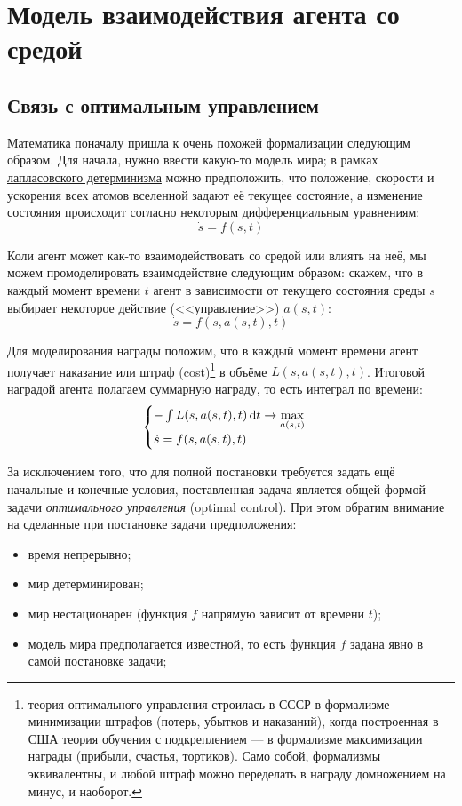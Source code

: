 \section{Модель взаимодействия агента со средой}

\subsection{Связь с оптимальным управлением}

Математика поначалу пришла к очень похожей формализации следующим образом. Для начала, нужно ввести какую-то модель мира; в рамках \href{https://ru.wikipedia.org/wiki/\%D0\%94\%D0\%B5\%D0\%BC\%D0\%BE\%D0\%BD_\%D0\%9B\%D0\%B0\%D0\%BF\%D0\%BB\%D0\%B0\%D1\%81\%D0\%B0}{лапласовского детерминизма} можно предположить, что положение, скорости и ускорения всех атомов вселенной задают её текущее состояние, а изменение состояния происходит согласно некоторым дифференциальным уравнениям:
$$\dot{s} = f(s, t)$$

Коли агент может как-то взаимодействовать со средой или влиять на неё, мы можем промоделировать взаимодействие следующим образом: скажем, что в каждый момент времени $t$ агент в зависимости от текущего состояния среды $s$ выбирает некоторое действие (<<управление>>) $a(s, t)$:
$$\dot{s} = f(s, a(s, t), t)$$

Для моделирования награды положим, что в каждый момент времени агент получает наказание или штраф (cost)\footnote{теория оптимального управления строилась в СССР в формализме минимизации штрафов (потерь, убытков и наказаний), когда построенная в США теория обучения с подкреплением --- в формализме максимизации награды (прибыли, счастья, тортиков). Само собой, формализмы эквивалентны, и любой штраф можно переделать в награду домножением на минус, и наоборот.} в объёме $L(s, a(s, t), t)$. Итоговой наградой агента полагаем суммарную награду, то есть интеграл по времени:
$$
\begin{cases}
-\int\limits L(s, a(s, t), t) \mathop{}\!\mathrm{d} t \to \max\limits_{a(s, t)} \\
\dot{s} = f(s, a(s, t), t)
\end{cases}
$$

За исключением того, что для полной постановки требуется задать ещё начальные и конечные условия, поставленная задача является общей формой задачи \emph{оптимального управления} (optimal control). При этом обратим внимание на сделанные при постановке задачи предположения:
\begin{itemize}
    \item время непрерывно;
    \item мир детерминирован;
    \item мир нестационарен (функция $f$ напрямую зависит от времени $t$);
    \item модель мира предполагается известной, то есть функция $f$ задана явно в самой постановке задачи;
\end{itemize}

